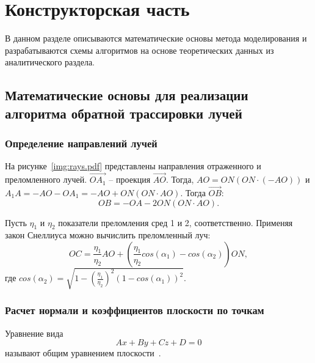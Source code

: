\section{Конструкторская часть}
В данном разделе описываются математические основы метода моделирования и разрабатываются схемы алгоритмов на основе теоретических данных из аналитического раздела.

\subsection{Математические основы для реализации алгоритма обратной трассировки лучей}

\subsubsection{Определение направлений лучей}
На рисунке~\ref{img:rays.pdf} представлены направления отраженного и преломленного лучей.
$\overrightarrow{OA_1}$ -- проекция $\overrightarrow{AO}$. Тогда, $AO = ON(ON\cdot(-AO))$ и $A_1A = -AO-OA_1 = -AO+ON(ON\cdot AO)$.
Тогда $\overrightarrow{OB}$:
\begin{equation}
	OB = -OA -2 ON(ON\cdot AO).
\end{equation}

Пусть $\eta_{1}$ и $\eta_{2}$ показатели преломления сред 1 и 2, соответственно. Применяя закон Снеллиуса можно вычислить преломленный луч:
\begin{equation}
	OC = \frac{\eta_{1}}{\eta_{2}}AO + (\frac{\eta_{1}}{\eta_{2}} cos(\alpha_1) - cos(\alpha_2)) ON,
\end{equation}
где $cos(\alpha_2) = \sqrt{1 -   (\frac{\eta_{1}}{\eta_{2}}) ^ 2 (1 - cos(\alpha_1))^2  }$.


\subsubsection{Расчет нормали и коэффициентов плоскости по точкам}
Уравнение вида 
\begin{equation}
	Ax + By + Cz + D = 0
\end{equation}
называют общим уравнением плоскости~\cite{angeom}.

